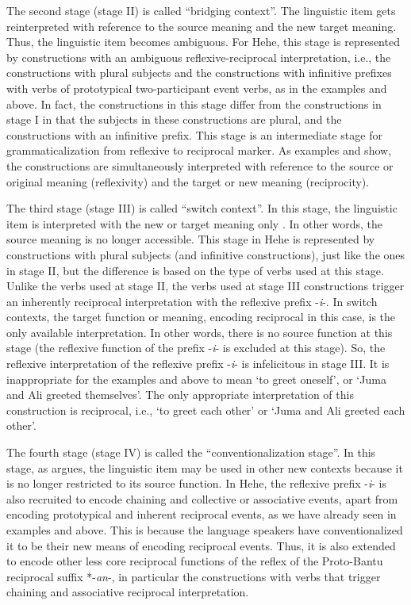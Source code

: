 \documentclass[output=paper,
            colorlinks, citecolor=brown
            ,draftmode
		  ]{langscibook}
\begin{document}
The second stage (stage II) is called ``bridging context''. The linguistic item gets reinterpreted with reference to the source meaning and the new target meaning. Thus, the linguistic item becomes ambiguous. For Hehe, this stage is represented by constructions with an ambiguous reflexive\nobreakdash-reciprocal interpretation, i.e., the constructions with plural subjects and the constructions with infinitive prefixes with verbs of prototypical two\nobreakdash-participant event verbs, as in the examples  and  above. In fact, the constructions in this stage differ from the constructions in stage I in that the subjects in these constructions are plural, and the constructions with an infinitive prefix. This stage is an intermediate stage for grammaticalization from reflexive to reciprocal marker. As examples  and  show, the constructions are simultaneously interpreted with reference to the source or original meaning (reflexivity) and the target or new meaning (reciprocity).

The third stage (stage III) is called ``switch context''. In this stage, the linguistic item is interpreted with the new or target meaning only \citep[85]{Heine2002}. In other words, the source meaning is no longer accessible. This stage in Hehe is represented by constructions with plural subjects (and infinitive constructions), just like the ones in stage II, but the difference is based on the type of verbs used at this stage. Unlike the verbs used at stage II, the verbs used at stage III constructions trigger an inherently reciprocal interpretation with the reflexive prefix -\textit{i}{}-. In switch contexts, the target function or meaning, encoding reciprocal in this case, is the only available interpretation. In other words, there is no source function at this stage (the reflexive function of the prefix -\textit{i}{}- is excluded at this stage). So, the reflexive interpretation of the reflexive prefix -\textit{i}{}- is infelicitous in stage III. It is inappropriate for the examples  and  above to mean ‘to greet oneself’, or ‘Juma and Ali greeted themselves’. The only appropriate interpretation of this construction is reciprocal, i.e., ‘to greet each other’ or ‘Juma and Ali greeted each other’.

The fourth stage (stage IV) is called the ``conventionalization stage''.  In this stage, as \citet[86]{Heine2002} argues, the linguistic item may be used in other new contexts because it is no longer restricted to its source function. In Hehe, the reflexive prefix -\textit{i}{}- is also recruited to encode chaining and collective or associative events, apart from encoding prototypical and inherent reciprocal events, as we have already seen in examples  and  above. This is because the language speakers have conventionalized it to be their new means of encoding reciprocal events. Thus, it is also extended to encode other less core reciprocal functions of the reflex of the Proto-Bantu reciprocal suffix *-\textit{an}{}-, in particular the constructions with verbs that trigger chaining and associative reciprocal interpretation.
\end{document}
